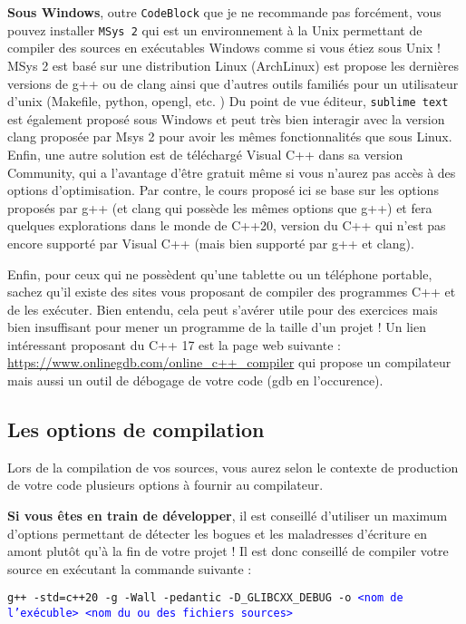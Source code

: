 \textbf{Sous Windows}, outre \texttt{CodeBlock} que je ne recommande pas forcément, vous pouvez installer \texttt{MSys 2} qui est un environnement à la Unix permettant de compiler des sources en exécutables Windows comme si vous étiez sous Unix ! MSys 2 est basé sur une distribution Linux (ArchLinux) est propose les dernières versions de g++ ou de clang ainsi que d'autres outils familiés pour un utilisateur d'unix (Makefile, python, opengl, etc. ) Du point de vue éditeur, \texttt{sublime text} est également proposé sous Windows et peut très bien interagir avec la version clang proposée par Msys 2 pour avoir les mêmes fonctionnalités que sous Linux. Enfin, une autre solution est de téléchargé Visual C++ dans sa version Community, qui a l'avantage d'être gratuit même si vous n'aurez pas accès à des options d'optimisation. Par contre, le cours proposé ici se base sur les options proposés par g++ (et clang qui possède les mêmes options que g++) et fera quelques explorations dans le monde de C++20, version du C++ qui n'est pas encore supporté par Visual C++ (mais bien supporté par g++ et clang).

Enfin, pour ceux qui ne possèdent qu'une tablette ou un téléphone portable, sachez qu'il existe des sites vous proposant de compiler des programmes C++ et de les exécuter. Bien entendu, cela peut s'avérer utile pour des exercices mais bien insuffisant pour mener un programme de la taille d'un projet ! Un lien intéressant proposant du C++ 17 est la page web suivante :
\url{https://www.onlinegdb.com/online_c++_compiler} qui propose un compilateur mais aussi un outil de débogage de votre code (gdb en l'occurence).

\subsection{Les options de compilation}

Lors de la compilation de vos sources, vous aurez selon le contexte de production de votre code plusieurs options à fournir au compilateur.

\textbf{Si vous êtes en train de développer}, il est conseillé d'utiliser un maximum d'options permettant de détecter les bogues et les maladresses d'écriture en amont plutôt qu'à la fin de votre projet ! Il est donc conseillé de compiler votre source en exécutant la commande suivante :

\texttt{g++ -std=c++20 -g -Wall -pedantic -D\_GLIBCXX\_DEBUG  -o \textcolor{blue}{<nom de l'exécuble> <nom du  ou des fichiers sources>}}

